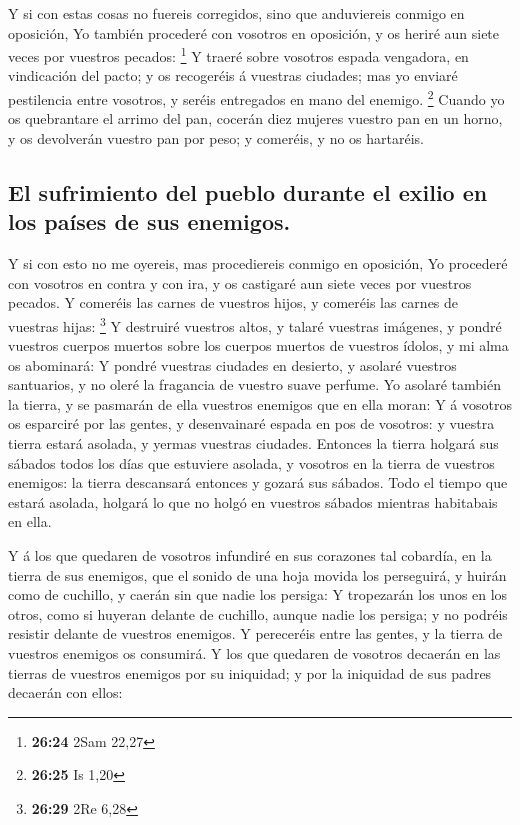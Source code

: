 Y si con estas cosas no fuereis corregidos, sino que
anduviereis conmigo en oposición,  Yo también procederé con
vosotros en oposición, y os heriré aun siete veces por vuestros pecados:
\footnote{\textbf{26:24} 2Sam 22,27}  Y traeré sobre
vosotros espada vengadora, en vindicación del pacto; y os recogeréis á
vuestras ciudades; mas yo enviaré pestilencia entre vosotros, y seréis
entregados en mano del enemigo. \footnote{\textbf{26:25} Is 1,20}
 Cuando yo os quebrantare el arrimo del pan, cocerán diez
mujeres vuestro pan en un horno, y os devolverán vuestro pan por peso; y
comeréis, y no os hartaréis.

\hypertarget{el-sufrimiento-del-pueblo-durante-el-exilio-en-los-pauxedses-de-sus-enemigos.}{%
\subsection{El sufrimiento del pueblo durante el exilio en los países de
sus
enemigos.}\label{el-sufrimiento-del-pueblo-durante-el-exilio-en-los-pauxedses-de-sus-enemigos.}}

 Y si con esto no me oyereis, mas procediereis conmigo en
oposición,  Yo procederé con vosotros en contra y con ira,
y os castigaré aun siete veces por vuestros pecados.  Y
comeréis las carnes de vuestros hijos, y comeréis las carnes de vuestras
hijas: \footnote{\textbf{26:29} 2Re 6,28}  Y destruiré
vuestros altos, y talaré vuestras imágenes, y pondré vuestros cuerpos
muertos sobre los cuerpos muertos de vuestros ídolos, y mi alma os
abominará:  Y pondré vuestras ciudades en desierto, y
asolaré vuestros santuarios, y no oleré la fragancia de vuestro suave
perfume.  Yo asolaré también la tierra, y se pasmarán de
ella vuestros enemigos que en ella moran:  Y á vosotros os
esparciré por las gentes, y desenvainaré espada en pos de vosotros: y
vuestra tierra estará asolada, y yermas vuestras ciudades. 
Entonces la tierra holgará sus sábados todos los días que estuviere
asolada, y vosotros en la tierra de vuestros enemigos: la tierra
descansará entonces y gozará sus sábados.  Todo el tiempo
que estará asolada, holgará lo que no holgó en vuestros sábados mientras
habitabais en ella.

 Y á los que quedaren de vosotros infundiré en sus
corazones tal cobardía, en la tierra de sus enemigos, que el sonido de
una hoja movida los perseguirá, y huirán como de cuchillo, y caerán sin
que nadie los persiga:  Y tropezarán los unos en los otros,
como si huyeran delante de cuchillo, aunque nadie los persiga; y no
podréis resistir delante de vuestros enemigos.  Y
pereceréis entre las gentes, y la tierra de vuestros enemigos os
consumirá.  Y los que quedaren de vosotros decaerán en las
tierras de vuestros enemigos por su iniquidad; y por la iniquidad de sus
padres decaerán con ellos:

